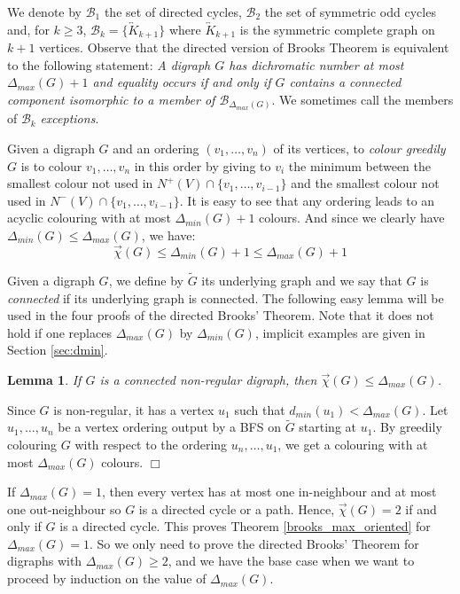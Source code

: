\documentclass[11pt]{article}
\newtheorem{lemma}{Lemma}[section]
\newcommand{\mc}{\mathcal}
\newcommand{\dic}{\vec{\chi}}
\newcommand{\olra}{\overleftrightarrow}
\newcommand{\dmax}{\Delta_{max}}
\newcommand{\dmin}{\Delta_{min}}
\newcounter{claim}
\newenvironment{proof}[1][]%
 {\noindent {\setcounter{claim}{0}\sc proof ---
   }{#1}{}}{\hfill$\Box$\vspace{2ex}}
\begin{document}
We denote by $\mc B_{1}$ the set of directed cycles, $\mc B_{2}$ the set of symmetric odd cycles and, for $k \geq 3$, $\mc B_{k} = \{\olra K_{k+1}\}$ where $\olra K_{k+1}$ is the symmetric complete graph on $k + 1$ vertices.
Observe that the directed version of Brooks Theorem is equivalent to the following statement: \emph{A digraph $G$ has dichromatic number at most $\dmax(G) +1$ and equality occurs if and only if $G$ contains a connected component isomorphic to a member of $\mc B_{\dmax(G)}$}. 
We sometimes call the members of $\mc B_k$ \emph{exceptions}.
\medskip

Given a digraph $G$ and an ordering $(v_1, \dots, v_n)$ of its vertices, 
to \textit{colour greedily}  $G$ is to colour $v_1, \dots, v_n$ in this order by giving to $v_i$ the minimum between the smallest colour not used in $N^+(V) \cap \{v_1, \dots, v_{i-1}\}$ and the smallest colour not used in $N^-(V) \cap \{v_1, \dots, v_{i-1}\}$. 
It is easy to see that any ordering leads to an acyclic colouring with at most $\Delta_{min}(G)+1$ colours. And since we clearly have $\dmin(G) \leq \dmax(G)$, we have:
$$\dic(G) \leq \Delta_{min}(G) +1 \leq \dmax(G) +1$$


Given a digraph $G$, we define by $\tilde G$ its underlying graph and we say that $G$ is \textit{connected} if its underlying graph is connected. 
The following easy lemma will be used in the four proofs of the directed Brooks' Theorem. Note that it does not hold if one replaces $\dmax(G)$ by $\dmin(G)$, implicit examples are given in Section \ref{sec:dmin}. 

\begin{lemma}\label{lem:reg}
If $G$ is a connected non-regular digraph, then  $\dic(G) \leq \Delta_{max}(G)$.
\end{lemma}

\begin{proof}
Since $G$ is non-regular, it has a vertex $u_1$ such that $d_{min}(u_1) < \Delta_{max}(G)$. Let $u_1, \dots, u_n$ be a vertex ordering output by a BFS on $\tilde G$ starting at $u_1$. By greedily colouring $G$ with respect to the ordering $u_n, \dots, u_1$, we get a colouring with at most  $\Delta_{max}(G)$ colours.
\end{proof}

If $\Delta_{max}(G) = 1$, then every vertex has at most one in-neighbour and at most one out-neighbour so $G$ is a directed cycle or a path. Hence, $\dic(G) = 2$ if and only if $G$ is a directed cycle. This proves Theorem \ref{brooks_max_oriented} for $\Delta_{max}(G) = 1$. So we only need to prove the directed Brooks' Theorem for digraphs with $\dmax(G) \geq 2$,  and we have the base case when we want to proceed by induction on the value of $\dmax(G)$. 
\end{document}

